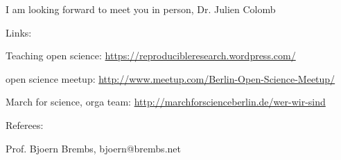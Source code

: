I am looking forward to meet you in person,
Dr. Julien Colomb

\vspace {1cm} 

Links:

Teaching open science: \url{https://reproducibleresearch.wordpress.com/}

open science meetup: \url{http://www.meetup.com/Berlin-Open-Science-Meetup/}

March for science, orga team: \url{http://marchforscienceberlin.de/wer-wir-sind}


\vspace {0.5cm} 

Referees:

Prof. Bjoern Brembs, bjoern@brembs.net
